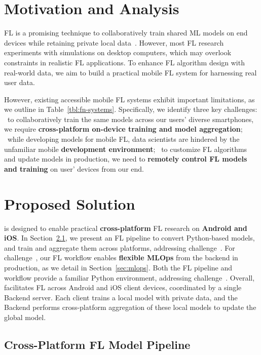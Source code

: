 \documentclass[conference]{IEEEtran}
\begin{document}

\section{Motivation and Analysis}

FL is a promising technique to collaboratively train shared ML models on
end devices while retaining private local data~\cite{wang2023federated}.
However, most FL research experiments with simulations on desktop computers,
which may overlook constraints in realistic FL applications.
To enhance FL algorithm design with real-world data,
we aim to build a practical mobile FL system for
harnessing real user data.

However,
existing accessible mobile FL systems exhibit important limitations,
as we outline in Table~\ref{tbl:fn-systems}.
Specifically, we identify three key challenges:
\challa~to collaboratively train the same models across
our users' diverse smartphones,
we require \textbf{cross-platform on-device training and model aggregation};
\challb~while developing models for mobile FL,
data scientists are hindered by
the unfamiliar mobile \textbf{development environment};
\challc~to customize FL algorithms and update models in production,
we need to \textbf{remotely control FL models and training} on
user' devices from our end.

\section{Proposed Solution}

\FedKit{} is designed to enable practical \textbf{cross-platform} FL research on
\textbf{Android and iOS}.
In Section~\ref{sec:pipeline},
we present an FL pipeline to convert Python-based models,
and train and aggregate them across platforms,
addressing challenge~\challa{}.
For challenge~\challc{},
our FL workflow enables \textbf{flexible MLOps} from the backend in production,
as we detail in Section~\ref{sec:mlops}.
Both the FL pipeline and workflow provide a familiar Python environment,
addressing challenge~\challb{}.
Overall,
\FedKit{} facilitates FL across Android and iOS client devices,
coordinated by a single Backend server.
Each client trains a local model with private data,
and the Backend performs cross-platform aggregation of these local models to update the global model.

\subsection{Cross-Platform FL Model Pipeline}
\label{sec:pipeline}
\end{document}
